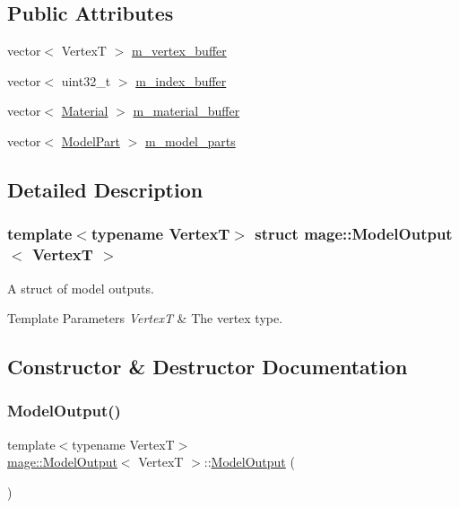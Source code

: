 \subsection*{Public Attributes}
\begin{DoxyCompactItemize}
\item 
vector$<$ VertexT $>$ \hyperlink{structmage_1_1_model_output_a4d669b5fee2d6a1bc993a94b0a2d5580}{m\+\_\+vertex\+\_\+buffer}
\item 
vector$<$ uint32\+\_\+t $>$ \hyperlink{structmage_1_1_model_output_afc6530c5fc47224b45d851e67dd5a306}{m\+\_\+index\+\_\+buffer}
\item 
vector$<$ \hyperlink{structmage_1_1_material}{Material} $>$ \hyperlink{structmage_1_1_model_output_a3bfdb493d92a83b40a8b363a96e89a0c}{m\+\_\+material\+\_\+buffer}
\item 
vector$<$ \hyperlink{structmage_1_1_model_part}{Model\+Part} $>$ \hyperlink{structmage_1_1_model_output_a86df369ff4959458ee6991c36e6aa01a}{m\+\_\+model\+\_\+parts}
\end{DoxyCompactItemize}


\subsection{Detailed Description}
\subsubsection*{template$<$typename VertexT$>$\newline
struct mage\+::\+Model\+Output$<$ Vertex\+T $>$}

A struct of model outputs.


\begin{DoxyTemplParams}{Template Parameters}
{\em VertexT} & The vertex type. \\
\hline
\end{DoxyTemplParams}


\subsection{Constructor \& Destructor Documentation}
\hypertarget{structmage_1_1_model_output_a7d64b57d8207968541eb9c6da6ef0163}{}\label{structmage_1_1_model_output_a7d64b57d8207968541eb9c6da6ef0163} 
\subsubsection{\texorpdfstring{Model\+Output()}{ModelOutput()}\hspace{0.1cm}{\footnotesize\ttfamily [1/3]}}
{\footnotesize\ttfamily template$<$typename VertexT$>$ \\
\hyperlink{structmage_1_1_model_output}{mage\+::\+Model\+Output}$<$ VertexT $>$\+::\hyperlink{structmage_1_1_model_output}{Model\+Output} (\begin{DoxyParamCaption}{ }\end{DoxyParamCaption})\hspace{0.3cm}{\ttfamily [default]}}

